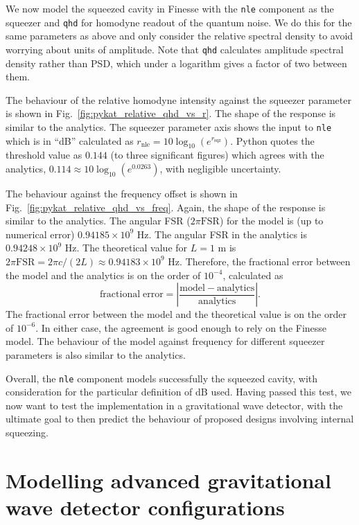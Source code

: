 \documentclass[aps,pra,superscriptaddress,reprint,nofootinbib]{revtex4-1}
\newcommand{\abs}[1]{\left\lvert #1 \right\rvert}
\newcommand{\code}[1]{\texttt{#1}}
\begin{document}
We now model the squeezed cavity in Finesse with the \code{nle} component as the squeezer and \code{qhd} for homodyne readout of the quantum noise. We do this for the same parameters as above and only consider the relative spectral density to avoid worrying about units of amplitude. Note that \code{qhd} calculates amplitude spectral density rather than PSD, which under a logarithm gives a factor of two between them.


The behaviour of the relative homodyne intensity against the squeezer parameter is shown in Fig.~\ref{fig:pykat_relative_qhd_vs_r}. The shape of the response is similar to the analytics. The squeezer parameter axis shows the input to \code{nle} which is in ``dB'' calculated as $r_{\mathrm{nle}} = 10 \log_{10}(e^{r_\mathrm{sqz}})$. Python quotes the threshold value as $0.144$ (to three significant figures) which agrees with the analytics, $0.114 \approx 10 \log_{10}(e^{0.0263})$, with negligible uncertainty.


The behaviour against the frequency offset is shown in Fig.~\ref{fig:pykat_relative_qhd_vs_freq}. Again, the shape of the response is similar to the analytics.
The angular FSR ($2 \pi \mathrm{FSR}$) for the model is (up to numerical error) $0.94185 \times 10^9$ Hz.
The angular FSR in the analytics is $0.94248 \times 10^9$ Hz.
The theoretical value for $L = 1$ m is $2 \pi \mathrm{FSR} = 2 \pi c/(2 L) \approx 0.94183 \times 10^9$ Hz.
Therefore, the fractional error between the model and the analytics is on the order of $10^{-4}$, calculated as
\begin{equation}
\mathrm{fractional\; error} = \abs{\frac{\mathrm{model} - \mathrm{analytics}}{\mathrm{analytics}}}.
\end{equation}
The fractional error between the model and the theoretical value is on the order of $10^{-6}$. In either case, the agreement is good enough to rely on the Finesse model.
The behaviour of the model against frequency for different squeezer parameters is also similar to the analytics.


Overall, the \code{nle} component models successfully the squeezed cavity, with consideration for the particular definition of dB used. Having passed this test, we now want to test the implementation in a gravitational wave detector, with the ultimate goal to then predict the behaviour of proposed designs involving internal squeezing.


\section{Modelling advanced gravitational wave detector configurations}
\label{sec:aLIGOcomparison}
\end{document}
